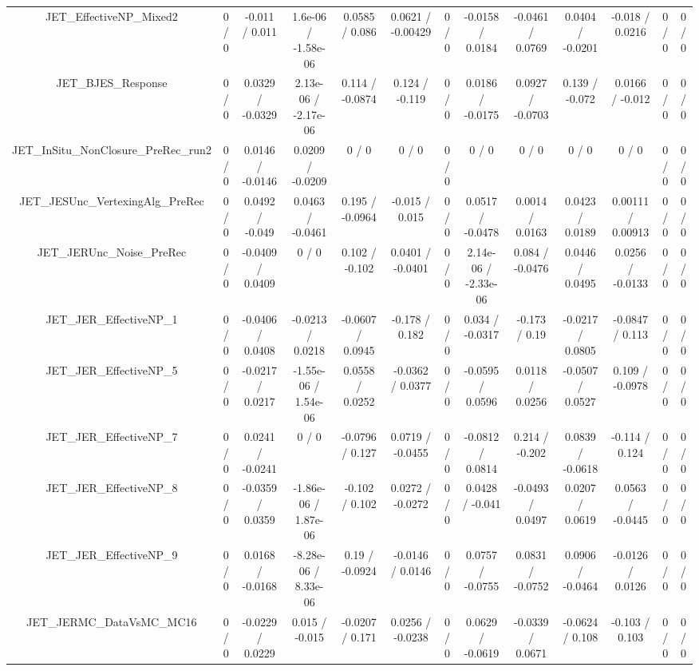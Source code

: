 \documentclass[10pt]{article}
\begin{document}
\begin{table}[htbp]
\begin{center}
\begin{tabular}{|c|c|c|c|c|c|c|c|c|c|c|c|c|}
  JET_EffectiveNP_Mixed2 & 0 / 0 & -0.011 / 0.011 & 1.6e-06 / -1.58e-06 & 0.0585 / 0.086 & 0.0621 / -0.00429 & 0 / 0 & -0.0158 / 0.0184 & -0.0461 / 0.0769 & 0.0404 / -0.0201 & -0.018 / 0.0216 & 0 / 0 & 0 / 0 \\ 
  JET_BJES_Response & 0 / 0 & 0.0329 / -0.0329 & 2.13e-06 / -2.17e-06 & 0.114 / -0.0874 & 0.124 / -0.119 & 0 / 0 & 0.0186 / -0.0175 & 0.0927 / -0.0703 & 0.139 / -0.072 & 0.0166 / -0.012 & 0 / 0 & 0 / 0 \\ 
  JET_InSitu_NonClosure_PreRec_run2 & 0 / 0 & 0.0146 / -0.0146 & 0.0209 / -0.0209 & 0 / 0 & 0 / 0 & 0 / 0 & 0 / 0 & 0 / 0 & 0 / 0 & 0 / 0 & 0 / 0 & 0 / 0 \\ 
  JET_JESUnc_VertexingAlg_PreRec & 0 / 0 & 0.0492 / -0.049 & 0.0463 / -0.0461 & 0.195 / -0.0964 & -0.015 / 0.015 & 0 / 0 & 0.0517 / -0.0478 & 0.0014 / 0.0163 & 0.0423 / 0.0189 & 0.00111 / 0.00913 & 0 / 0 & 0 / 0 \\ 
  JET_JERUnc_Noise_PreRec & 0 / 0 & -0.0409 / 0.0409 & 0 / 0 & 0.102 / -0.102 & 0.0401 / -0.0401 & 0 / 0 & 2.14e-06 / -2.33e-06 & 0.084 / -0.0476 & 0.0446 / 0.0495 & 0.0256 / -0.0133 & 0 / 0 & 0 / 0 \\ 
  JET_JER_EffectiveNP_1 & 0 / 0 & -0.0406 / 0.0408 & -0.0213 / 0.0218 & -0.0607 / 0.0945 & -0.178 / 0.182 & 0 / 0 & 0.034 / -0.0317 & -0.173 / 0.19 & -0.0217 / 0.0805 & -0.0847 / 0.113 & 0 / 0 & 0 / 0 \\ 
  JET_JER_EffectiveNP_5 & 0 / 0 & -0.0217 / 0.0217 & -1.55e-06 / 1.54e-06 & 0.0558 / 0.0252 & -0.0362 / 0.0377 & 0 / 0 & -0.0595 / 0.0596 & 0.0118 / 0.0256 & -0.0507 / 0.0527 & 0.109 / -0.0978 & 0 / 0 & 0 / 0 \\ 
  JET_JER_EffectiveNP_7 & 0 / 0 & 0.0241 / -0.0241 & 0 / 0 & -0.0796 / 0.127 & 0.0719 / -0.0455 & 0 / 0 & -0.0812 / 0.0814 & 0.214 / -0.202 & 0.0839 / -0.0618 & -0.114 / 0.124 & 0 / 0 & 0 / 0 \\ 
  JET_JER_EffectiveNP_8 & 0 / 0 & -0.0359 / 0.0359 & -1.86e-06 / 1.87e-06 & -0.102 / 0.102 & 0.0272 / -0.0272 & 0 / 0 & 0.0428 / -0.041 & -0.0493 / 0.0497 & 0.0207 / 0.0619 & 0.0563 / -0.0445 & 0 / 0 & 0 / 0 \\ 
  JET_JER_EffectiveNP_9 & 0 / 0 & 0.0168 / -0.0168 & -8.28e-06 / 8.33e-06 & 0.19 / -0.0924 & -0.0146 / 0.0146 & 0 / 0 & 0.0757 / -0.0755 & 0.0831 / -0.0752 & 0.0906 / -0.0464 & -0.0126 / 0.0126 & 0 / 0 & 0 / 0 \\ 
  JET_JERMC_DataVsMC_MC16 & 0 / 0 & -0.0229 / 0.0229 & 0.015 / -0.015 & -0.0207 / 0.171 & 0.0256 / -0.0238 & 0 / 0 & 0.0629 / -0.0619 & -0.0339 / 0.0671 & -0.0624 / 0.108 & -0.103 / 0.103 & 0 / 0 & 0 / 0 \\ 

\end{tabular}
\end{center}
\end{table}
\end{document}
